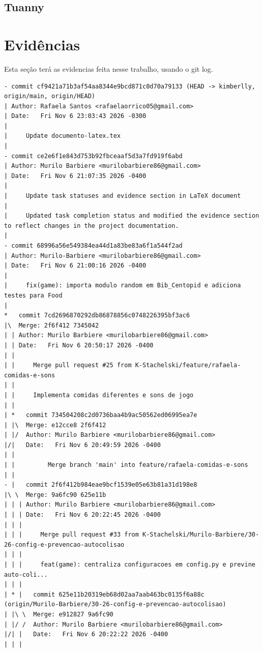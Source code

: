 \documentclass[12pt]{article}
\begin{document}
\subsection{Tuanny}

\section{Evidências}
Esta seção terá as evidencias feita nesse trabalho, usando o git log.
\begin{lstlisting}
- commit cf9421a71b3af54aa8344e9bcd871c0d70a79133 (HEAD -> kimberlly, origin/main, origin/HEAD)
| Author: Rafaela Santos <rafaelaorrico05@gmail.com>
| Date:   Fri Nov 6 23:03:43 2026 -0300
| 
|     Update documento-latex.tex
| 
- commit ce2e6f1e843d753b92fbceaaf5d3a7fd919f6abd
| Author: Murilo Barbiere <murilobarbiere86@gmail.com>
| Date:   Fri Nov 6 21:07:35 2026 -0400
| 
|     Update task statuses and evidence section in LaTeX document
|     
|     Updated task completion status and modified the evidence section to reflect changes in the project documentation.
| 
- commit 68996a56e549384ea44d1a83be83a6f1a544f2ad
| Author: Murilo-Barbiere <murilobarbiere86@gmail.com>
| Date:   Fri Nov 6 21:00:16 2026 -0400
| 
|     fix(game): importa modulo random em Bib_Centopid e adiciona testes para Food
|   
*   commit 7cd2696870292db86878856c0748226395bf3ac6
|\  Merge: 2f6f412 7345042
| | Author: Murilo Barbiere <murilobarbiere86@gmail.com>
| | Date:   Fri Nov 6 20:50:17 2026 -0400
| | 
| |     Merge pull request #25 from K-Stachelski/feature/rafaela-comidas-e-sons
| |     
| |     Implementa comidas diferentes e sons de jogo
| |   
| *   commit 734504208c2d0736baa4b9ac50562ed06995ea7e
| |\  Merge: e12cce8 2f6f412
| |/  Author: Murilo Barbiere <murilobarbiere86@gmail.com>
|/|   Date:   Fri Nov 6 20:49:59 2026 -0400
| |   
| |         Merge branch 'main' into feature/rafaela-comidas-e-sons
| |   
- |   commit 2f6f412b984eae9bcf1539e05e63b81a31d198e8
|\ \  Merge: 9a6fc90 625e11b
| | | Author: Murilo Barbiere <murilobarbiere86@gmail.com>
| | | Date:   Fri Nov 6 20:22:45 2026 -0400
| | | 
| | |     Merge pull request #33 from K-Stachelski/Murilo-Barbiere/30-26-config-e-prevencao-autocolisao
| | |     
| | |     feat(game): centraliza configuracoes em config.py e previne auto-coli...
| | |   
| * |   commit 625e11b20319eb68d02aa7aab463bc0135f6a88c (origin/Murilo-Barbiere/30-26-config-e-prevencao-autocolisao)
| |\ \  Merge: e912827 9a6fc90
| |/ /  Author: Murilo Barbiere <murilobarbiere86@gmail.com>
|/| |   Date:   Fri Nov 6 20:22:22 2026 -0400
| | |   

\end{lstlisting}
\end{document}
